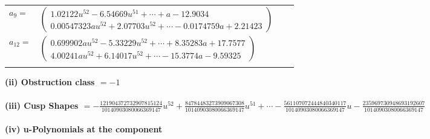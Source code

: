\documentclass[1p]{elsarticle_modified}
\theoremstyle{definition}
\begin{document}
\begin{tabular}{m{7pt} m{180pt} m{7pt} m{180pt} }
\flushright $a_{9}=$&$\begin{pmatrix}1.02122 u^{52}-6.54669 u^{51}+\cdots+a-12.9034\\0.00547323 a u^{52}+2.07703 u^{52}+\cdots-0.0174759 a+2.21423\end{pmatrix}$ \\
\flushright $a_{12}=$&$\begin{pmatrix}0.699902 a u^{52}-5.33229 u^{52}+\cdots+8.35283 a+17.7577\\4.00241 a u^{52}+6.14017 u^{52}+\cdots-15.3774 a-9.59325\end{pmatrix}$\\&\end{tabular}
\flushleft \textbf{(ii) Obstruction class $= -1$}\\~\\
\flushleft \textbf{(iii) Cusp Shapes $= -\frac{121904372732907815124}{10140903080066369147} u^{52}+\frac{84784483273909067308}{10140903080066369147} u^{51}+\cdots-\frac{561107072444840340117}{10140903080066369147} u-\frac{235969730948693192607}{10140903080066369147}$}\\~\\
\newpage\renewcommand{\arraystretch}{1}
\flushleft \textbf{(iv) u-Polynomials at the component}\newline \\
\end{document}
